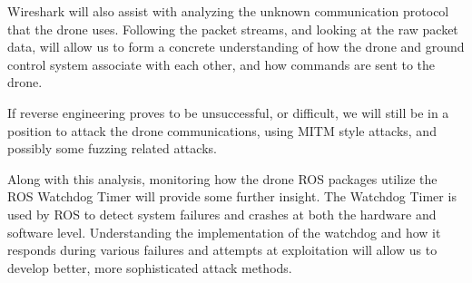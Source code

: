 \documentclass[IEEEtran,letterpaper,10pt,titlepage,draftclsnofoot,onecolumn]{article}
\begin{document}
Wireshark will also assist with analyzing the unknown communication protocol that the drone uses. Following the packet
streams, and looking at the raw packet data, will allow us to form a concrete understanding of how the drone and
ground control system associate with each other, and how commands are sent to the drone\cite{UknProto}.

If reverse engineering proves to be unsuccessful, or difficult, we will still be in a position to attack the drone
communications, using MITM style attacks, and possibly some fuzzing related attacks\cite{Fuzzy}.

Along with this analysis, monitoring how the drone ROS packages utilize the ROS Watchdog Timer will provide some
further insight. The Watchdog Timer is used by ROS to detect system failures and crashes at both the hardware and
software level\cite{doggo_watching}. Understanding the implementation of the watchdog and how it responds
during various failures and attempts at exploitation will allow us to develop better, more sophisticated attack
methods.


\end{document}
